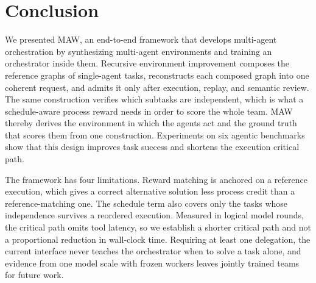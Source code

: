 \section{Conclusion}
\label{sec:conclusion}

We presented MAW, an end-to-end framework that develops multi-agent orchestration by synthesizing multi-agent environments and training an orchestrator inside them.
Recursive environment improvement composes the reference graphs of single-agent tasks, reconstructs each composed graph into one coherent request, and admits it only after execution, replay, and semantic review.
The same construction verifies which subtasks are independent, which is what a schedule-aware process reward needs in order to score the whole team.
MAW thereby derives the environment in which the agents act and the ground truth that scores them from one construction.
Experiments on six agentic benchmarks show that this design improves task success and shortens the execution critical path.

The framework has four limitations.
Reward matching is anchored on a reference execution, which gives a correct alternative solution less process credit than a reference-matching one.
The schedule term also covers only the tasks whose independence survives a reordered execution.
Measured in logical model rounds, the critical path omits tool latency, so we establish a shorter critical path and not a proportional reduction in wall-clock time.
Requiring at least one delegation, the current interface never teaches the orchestrator when to solve a task alone, and evidence from one model scale with frozen workers leaves jointly trained teams for future work.
